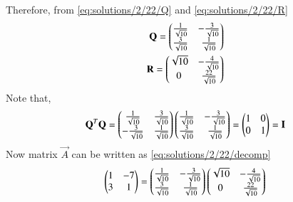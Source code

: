 Therefore, from \eqref{eq:solutions/2/22/Q} and \eqref{eq:solutions/2/22/R}
\begin{align}
    \mathbf{Q}=\begin{pmatrix}\frac{1}{\sqrt{10}} & -\frac{3}{\sqrt{10}} \\ \frac{3}{\sqrt{10}} & \frac{1}{\sqrt{10}}\end{pmatrix}\\
    \mathbf{R}=\begin{pmatrix}\sqrt{10} & -\frac{4}{\sqrt{10}} \\ 0 & \frac{22}{\sqrt{10}}\end{pmatrix}
\end{align}
Note that,
\begin{align}
    \mathbf{Q}^T\mathbf{Q}=\begin{pmatrix}\frac{1}{\sqrt{10}} & \frac{3}{\sqrt{10}} \\ -\frac{3}{\sqrt{10}} & \frac{1}{\sqrt{10}}\end{pmatrix}\begin{pmatrix}\frac{1}{\sqrt{10}} & -\frac{3}{\sqrt{10}} \\ \frac{3}{\sqrt{10}} & \frac{1}{\sqrt{10}}\end{pmatrix}=\begin{pmatrix}1 & 0\\ 0 & 1\end{pmatrix}=\mathbf{I}
\end{align}
Now matrix $\vec{A}$ can be written as \eqref{eq:solutions/2/22/decomp}
\begin{align}
    \begin{pmatrix}1 &-7 \\ 3 & 1\end{pmatrix}=\begin{pmatrix}\frac{1}{\sqrt{10}} & -\frac{3}{\sqrt{10}} \\ \frac{3}{\sqrt{10}} & \frac{1}{\sqrt{10}}\end{pmatrix}\begin{pmatrix}\sqrt{10} & -\frac{4}{\sqrt{10}} \\ 0 & \frac{22}{\sqrt{10}}\end{pmatrix}
\end{align}
